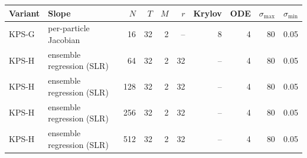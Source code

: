 \begin{tabular}{llrrrrrrrr}
\toprule
Variant & Slope & $N$ & $T$ & $M$ & $r$ & Krylov & ODE & $\sigma_{\max}$ & $\sigma_{\min}$ \\
\midrule
KPS-G & per-particle Jacobian & 16 & 32 & 2 & -- & 8 & 4 & 80 & 0.05 \\
KPS-H & ensemble regression (SLR) & 64 & 32 & 2 & 32 & -- & 4 & 80 & 0.05 \\
KPS-H & ensemble regression (SLR) & 128 & 32 & 2 & 32 & -- & 4 & 80 & 0.05 \\
KPS-H & ensemble regression (SLR) & 256 & 32 & 2 & 32 & -- & 4 & 80 & 0.05 \\
KPS-H & ensemble regression (SLR) & 512 & 32 & 2 & 32 & -- & 4 & 80 & 0.05 \\
\bottomrule
\end{tabular}